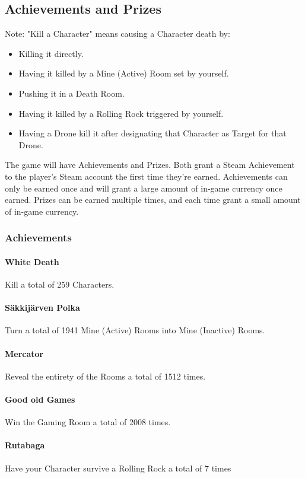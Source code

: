 \subsection{Achievements and Prizes}

Note: "Kill a Character" means causing a Character death by:
\begin{itemize}
	\item Killing it directly.
	\item Having it killed by a Mine (Active) Room set by yourself.
	\item Pushing it in a Death Room.
	\item Having it killed by a Rolling Rock triggered by yourself.
	\item Having a Drone kill it after designating that Character as Target for that Drone.
\end{itemize}

The game will have Achievements and Prizes. Both grant a Steam Achievement to the player's Steam account the first time they're earned.
Achievements can only be earned once and will grant a large amount of in-game currency once earned. Prizes can be earned multiple times, and each time grant a small amount of in-game currency.

\subsubsection{Achievements}

\paragraph{White Death} Kill a total of 259 Characters.
\paragraph{Säkkijärven Polka} Turn a total of 1941 Mine (Active) Rooms into Mine (Inactive) Rooms.
\paragraph{Mercator} Reveal the entirety of the Rooms a total of 1512 times.

\paragraph{Good old Games} Win the Gaming Room a total of 2008 times.
\paragraph{Rutabaga} Have your Character survive a Rolling Rock a total of 7 times
